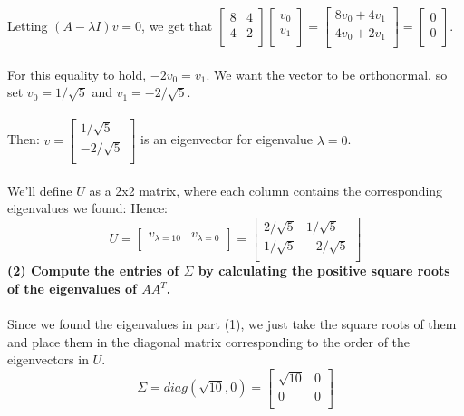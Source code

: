 \documentclass[11pt]{article}
\begin{document}
Letting $(A - \lambda I)v = 0$, we get that $ \begin{bmatrix}
8 & 4 \\
4 & 2 \\
\end{bmatrix} \begin{bmatrix}
v_0 \\
v_1 \\
\end{bmatrix} = \begin{bmatrix}
8v_0 + 4v_1 \\
4v_0 + 2v_1 \\
\end{bmatrix} = \begin{bmatrix}
0 \\
0 \\
\end{bmatrix} $. \\\\
For this equality to hold, $-2v_0 = v_1$. We want the vector to be orthonormal, so set $v_0 = 1 / \sqrt5$ and $v_1 = - 2 / \sqrt5.$ \\\\
Then: $v = \begin{bmatrix}
1 / \sqrt5 \\
-2 / \sqrt5 \\
\end{bmatrix}$ is an eigenvector for eigenvalue $\lambda = 0$. \\\\
We'll define $U$ as a 2x2 matrix, where each column contains the corresponding eigenvalues we found:
Hence:
$$ \boxed{ U = \begin{bmatrix} 
v_{\lambda = 10} & v_{\lambda = 0} \\
\end{bmatrix} = \begin{bmatrix}
2 / \sqrt5 & 1 / \sqrt5 \\
1 / \sqrt5 & -2 / \sqrt5 \\
\end{bmatrix}}$$
\textbf{(2) Compute the entries of $\Sigma$ by calculating the positive square roots of the eigenvalues of $AA^T$.}
\\\\
Since we found the eigenvalues in part (1), we just take the square roots of them and place them in the diagonal matrix corresponding to the order of the eigenvectors in $U$.
$$\boxed{\Sigma = diag(\sqrt{10}, 0) = \begin{bmatrix}
\sqrt{10} & 0 \\
0 & 0 \\
\end{bmatrix}} $$
\end{document}
